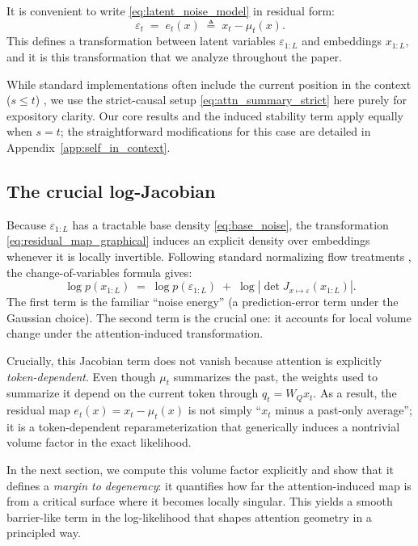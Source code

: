 \documentclass[11pt]{article}
\begin{document}
It is convenient to write \eqref{eq:latent_noise_model} in residual form:
\begin{equation}
\varepsilon_t \;=\; e_t(x) \;\triangleq\; x_t - \mu_t(x).
\label{eq:residual_map_graphical}
\end{equation}
This defines a transformation between latent variables $\varepsilon_{1:L}$ and embeddings $x_{1:L}$, and it is this transformation that we analyze throughout the paper.

While standard implementations often include the current position in the context ($s \le t$) \citep{RadfordWuChEtAl19,BrownMaRyEtAl20}, we use the strict-causal setup \eqref{eq:attn_summary_strict} here purely for expository clarity. Our core results and the induced stability term apply equally when $s = t$; the straightforward modifications for this case are detailed in Appendix~\ref{app:self_in_context}.

\subsection{The crucial log-Jacobian}
Because $\varepsilon_{1:L}$ has a tractable base density \eqref{eq:base_noise}, the transformation \eqref{eq:residual_map_graphical} induces an explicit density over embeddings whenever it is locally invertible. Following standard normalizing flow treatments \citep{PapamakariosNaReMoLa21}, the change-of-variables formula gives:
\begin{equation}
\log p(x_{1:L})
\;=\;
\log p(\varepsilon_{1:L})
\;+\;
\log \left|\det J_{x \mapsto \varepsilon}(x_{1:L})\right|.
\label{eq:cov_graphical}
\end{equation}
The first term is the familiar ``noise energy'' (a prediction-error term under the Gaussian choice). The second term is the crucial one: it accounts for local volume change under the attention-induced transformation.

Crucially, this Jacobian term does not vanish because attention is explicitly \emph{token-dependent}. Even though $\mu_t$ summarizes the past, the weights used to summarize it depend on the current token through $q_t=W_Qx_t$. As a result, the residual map $e_t(x)=x_t-\mu_t(x)$ is not simply ``$x_t$ minus a past-only average''; it is a token-dependent reparameterization that generically induces a nontrivial volume factor in the exact likelihood.

In the next section, we compute this volume factor explicitly and show that it defines a \emph{margin to degeneracy}: it quantifies how far the attention-induced map is from a critical surface where it becomes locally singular. This yields a smooth barrier-like term in the log-likelihood that shapes attention geometry in a principled way.
\end{document}
